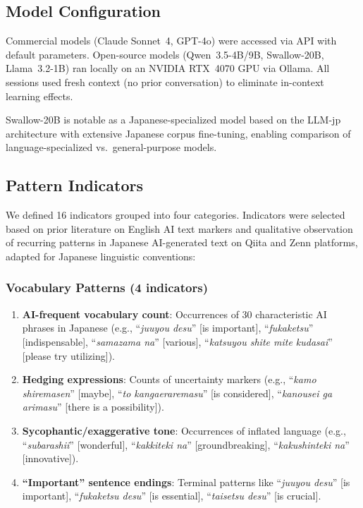 \documentclass[11pt,a4paper]{article}
\begin{document}
\subsection{Model Configuration}

Commercial models (Claude Sonnet~4, GPT-4o) were accessed via API with default parameters. Open-source models (Qwen~3.5-4B/9B, Swallow-20B, Llama~3.2-1B) ran locally on an NVIDIA RTX~4070 GPU via Ollama. All sessions used fresh context (no prior conversation) to eliminate in-context learning effects.

Swallow-20B is notable as a Japanese-specialized model based on the LLM-jp architecture with extensive Japanese corpus fine-tuning, enabling comparison of language-specialized vs.\ general-purpose models.

\subsection{Pattern Indicators}

We defined 16 indicators grouped into four categories. Indicators were selected based on prior literature on English AI text markers \cite{liang2024,guo2024} and qualitative observation of recurring patterns in Japanese AI-generated text on Qiita and Zenn platforms, adapted for Japanese linguistic conventions:

\subsubsection{Vocabulary Patterns (4 indicators)}
\begin{enumerate}
    \item \textbf{AI-frequent vocabulary count}: Occurrences of 30 characteristic AI phrases in Japanese (e.g., ``\textit{juuyou desu}'' [is important], ``\textit{fukaketsu}'' [indispensable], ``\textit{samazama na}'' [various], ``\textit{katsuyou shite mite kudasai}'' [please try utilizing]).
    \item \textbf{Hedging expressions}: Counts of uncertainty markers (e.g., ``\textit{kamo shiremasen}'' [maybe], ``\textit{to kangaeraremasu}'' [is considered], ``\textit{kanousei ga arimasu}'' [there is a possibility]).
    \item \textbf{Sycophantic/exaggerative tone}: Occurrences of inflated language (e.g., ``\textit{subarashii}'' [wonderful], ``\textit{kakkiteki na}'' [groundbreaking], ``\textit{kakushinteki na}'' [innovative]).
    \item \textbf{``Important'' sentence endings}: Terminal patterns like ``\textit{juuyou desu}'' [is important], ``\textit{fukaketsu desu}'' [is essential], ``\textit{taisetsu desu}'' [is crucial].
\end{enumerate}
\end{document}

